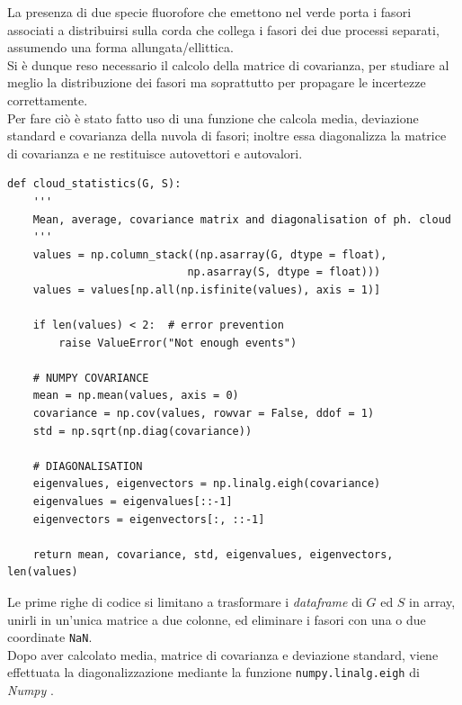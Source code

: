 La presenza di due specie fluorofore che emettono nel verde porta i fasori associati a distribuirsi sulla corda che collega i fasori dei due processi separati, assumendo una forma allungata/ellittica.\\
Si è dunque reso necessario il calcolo della matrice di covarianza, per studiare al meglio la distribuzione dei fasori ma soprattutto per propagare le incertezze correttamente.\\ %
Per fare ciò è stato fatto uso di una funzione che calcola media, deviazione standard e covarianza della nuvola di fasori; inoltre essa diagonalizza la matrice di covarianza e ne restituisce autovettori e autovalori. %
\begin{verbatim}
def cloud_statistics(G, S): 
    '''
    Mean, average, covariance matrix and diagonalisation of ph. cloud
    '''
    values = np.column_stack((np.asarray(G, dtype = float), 
                            np.asarray(S, dtype = float)))
    values = values[np.all(np.isfinite(values), axis = 1)]

    if len(values) < 2:  # error prevention
        raise ValueError("Not enough events")

    # NUMPY COVARIANCE
    mean = np.mean(values, axis = 0) 
    covariance = np.cov(values, rowvar = False, ddof = 1)
    std = np.sqrt(np.diag(covariance))

    # DIAGONALISATION 
    eigenvalues, eigenvectors = np.linalg.eigh(covariance)  
    eigenvalues = eigenvalues[::-1]
    eigenvectors = eigenvectors[:, ::-1]

    return mean, covariance, std, eigenvalues, eigenvectors, len(values)
\end{verbatim}
Le prime righe di codice si limitano a trasformare i \textit{dataframe} di $G$ ed $S$ in array, unirli in un'unica matrice a due colonne, ed eliminare i fasori con una o due coordinate \texttt{NaN}.\\
Dopo aver calcolato media, matrice di covarianza e deviazione standard, viene effettuata la diagonalizzazione mediante la funzione \texttt{numpy.linalg.eigh} di \textit{Numpy} \cite{harrisArrayProgrammingNumPy2020}.

